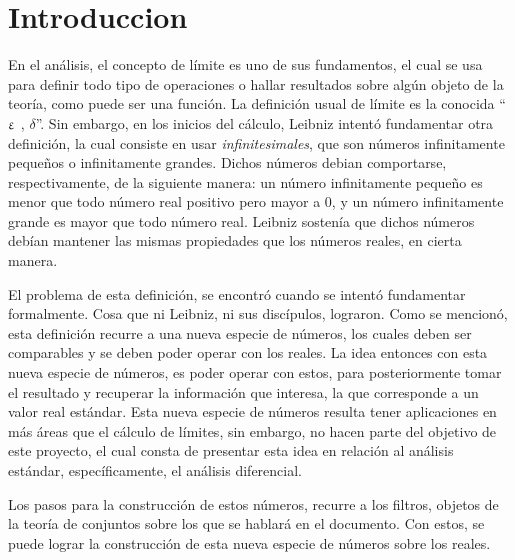 \section{Introduccion}

En el análisis, el concepto de límite es uno de sus fundamentos,
el cual se usa para definir todo tipo de operaciones o hallar
resultados sobre algún objeto de la teoría, como puede ser una
función. La definición usual de límite es la conocida
``$\upvarepsilon$ , $\delta$''. Sin embargo, en los inicios del cálculo,
Leibniz intentó fundamentar otra definición, la cual consiste en
usar \emph{infinitesimales}, que son números infinitamente pequeños
o infinitamente grandes. Dichos números debian comportarse,
respectivamente, de la siguiente manera:
un número infinitamente pequeño es menor que todo número real positivo
pero mayor a $0$, y un número infinitamente grande es mayor que todo
número real. Leibniz sostenía que dichos números debían mantener las
mismas propiedades que los números reales, en cierta manera.

El problema de esta definición, se encontró cuando se intentó fundamentar
formalmente. Cosa que ni Leibniz, ni sus discípulos, lograron.
Como se mencionó, esta definición recurre a una nueva especie de números, los cuales
deben ser comparables y se deben poder operar con los reales. La idea entonces
con esta nueva especie de números, es poder operar con estos, para
posteriormente tomar el resultado y recuperar la información que interesa,
la que corresponde a un valor real estándar. Esta nueva especie de números
resulta tener aplicaciones en más áreas que el cálculo de límites, sin
embargo, no hacen parte del objetivo de este proyecto, el cual consta de
presentar esta idea en relación al análisis estándar, específicamente,
el análisis diferencial.

Los pasos para la construcción de estos números, recurre a los filtros,
objetos de la teoría de conjuntos sobre los que se hablará en el
documento. Con estos, se puede lograr la construcción de esta nueva especie
de números sobre los reales. 
